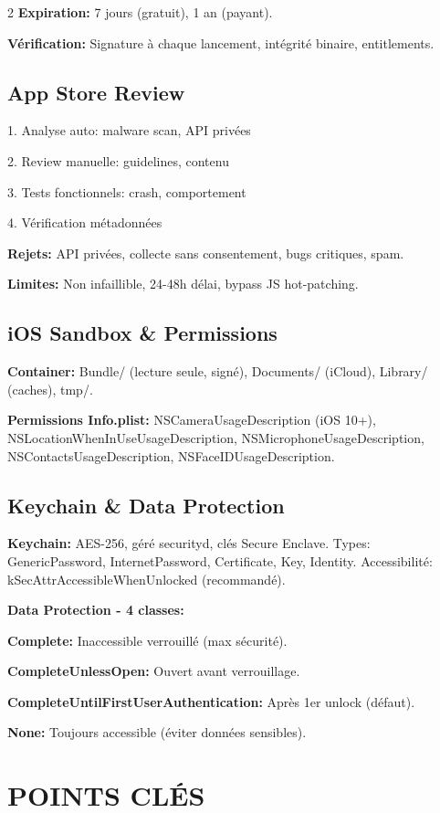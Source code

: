 \documentclass[9pt,a4paper]{extarticle}
\begin{document}
\begin{multicols}{2}
\textbf{Expiration:} 7 jours (gratuit), 1 an (payant).

\textbf{Vérification:} Signature à chaque lancement, intégrité binaire, entitlements.

\subsection*{App Store Review}
1. Analyse auto: malware scan, API privées

2. Review manuelle: guidelines, contenu

3. Tests fonctionnels: crash, comportement

4. Vérification métadonnées

\textbf{Rejets:} API privées, collecte sans consentement, bugs critiques, spam.

\textbf{Limites:} Non infaillible, 24-48h délai, bypass JS hot-patching.

\subsection*{iOS Sandbox \& Permissions}
\textbf{Container:} Bundle/ (lecture seule, signé), Documents/ (iCloud), Library/ (caches), tmp/.

\textbf{Permissions Info.plist:} NSCameraUsageDescription (iOS 10+), NSLocationWhenInUseUsageDescription, NSMicrophoneUsageDescription, NSContactsUsageDescription, NSFaceIDUsageDescription.

\subsection*{Keychain \& Data Protection}
\textbf{Keychain:} AES-256, géré securityd, clés Secure Enclave. Types: GenericPassword, InternetPassword, Certificate, Key, Identity. Accessibilité: kSecAttrAccessibleWhenUnlocked (recommandé).

\textbf{Data Protection - 4 classes:}

\textbf{Complete:} Inaccessible verrouillé (max sécurité).

\textbf{CompleteUnlessOpen:} Ouvert avant verrouillage.

\textbf{CompleteUntilFirstUserAuthentication:} Après 1er unlock (défaut).

\textbf{None:} Toujours accessible (éviter données sensibles).

\section*{POINTS CLÉS}


\end{multicols}
\end{document}
